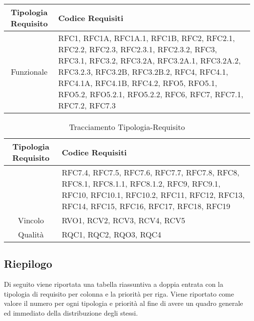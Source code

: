 \begin{table}[!htbp] %
            \centering
            \renewcommand{\arraystretch}{2} %
            \begin{tabular}{|c|p{2cm}|} %
                \rowcolor{orange!50} %
        		\hline
        		\textbf{Tipologia Requisito} & \textbf{Codice Requisiti} \\
                \hline
                Funzionale & RFC1, RFC1A, RFC1A.1, RFC1B, RFC2, RFC2.1, RFC2.2, RFC2.3, RFC2.3.1, RFC2.3.2, RFC3, RFC3.1, RFC3.2, RFC3.2A, RFC3.2A.1, RFC3.2A.2, RFC3.2.3, RFC3.2B, RFC3.2B.2, RFC4, RFC4.1, RFC4.1A, RFC4.1B, RFC4.2, RFO5, RFO5.1, RFO5.2, RFO5.2.1, RFO5.2.2, RFC6, RFC7, RFC7.1, RFC7.2, RFC7.3 \\
                \hline
            \end{tabular}
\end{table}
\begin{table}[!htbp] %
            \centering
            \renewcommand{\arraystretch}{2} %
            \begin{tabular}{|c|p{2cm}|} %
                \rowcolor{orange!50} %
        		\hline
        		\textbf{Tipologia Requisito} & \textbf{Codice Requisiti} \\
                \hline
                & RFC7.4, RFC7.5, RFC7.6, RFC7.7, RFC7.8, RFC8, RFC8.1, RFC8.1.1, RFC8.1.2, RFC9, RFC9.1, RFC10, RFC10.1, RFC10.2, RFC11, RFC12, RFC13, RFC14, RFC15, RFC16, RFC17, RFC18, RFC19 \\
                \hline
                Vincolo & RVO1, RCV2, RCV3, RCV4, RCV5\\
                \hline
                Qualità & RQC1, RQC2, RQO3, RQC4\\
                \hline
        \end{tabular}
        \caption{Tracciamento Tipologia-Requisito} %
\end{table}

\newpage
\subsection{Riepilogo}
Di seguito viene riportata una tabella riassuntiva a doppia entrata con la tipologia di requisito per colonna e la priorità per riga. Viene riportato come valore il numero per ogni tipologia e priorità al fine di avere un quadro generale ed immediato della distribuzione degli stessi.

